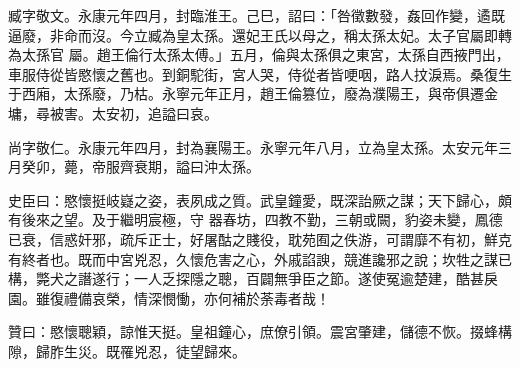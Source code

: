 \begin{pinyinscope}
 臧字敬文。永康元年四月，封臨淮王。己巳，詔曰：「咎徵數發，姦回作變，遹既逼廢，非命而沒。今立臧為皇太孫。還妃王氏以母之，稱太孫太妃。太子官屬即轉為太孫官
 屬。趙王倫行太孫太傅。」五月，倫與太孫俱之東宮，太孫自西掖門出，車服侍從皆愍懷之舊也。到銅駝街，宮人哭，侍從者皆哽咽，路人抆淚焉。桑復生于西廂，太孫廢，乃枯。永寧元年正月，趙王倫篡位，廢為濮陽王，與帝俱遷金墉，尋被害。太安初，追謚曰哀。



 尚字敬仁。永康元年四月，封為襄陽王。永寧元年八月，立為皇太孫。太安元年三月癸卯，薨，帝服齊衰期，謚曰沖太孫。



 史臣曰：愍懷挺岐嶷之姿，表夙成之質。武皇鐘愛，既深詒厥之謀；天下歸心，頗有後來之望。及于繼明宸極，守
 器春坊，四教不勤，三朝或闕，豹姿未變，鳳德已衰，信惑奸邪，疏斥正士，好屠酤之賤役，耽苑囿之佚游，可謂靡不有初，鮮克有終者也。既而中宮兇忍，久懷危害之心，外戚諂諛，競進讒邪之說；坎牲之謀已構，斃犬之譖遂行；一人乏探隱之聰，百闢無爭臣之節。遂使冤逾楚建，酷甚戾園。雖復禮備哀榮，情深憫慟，亦何補於荼毒者哉！



 贊曰：愍懷聰穎，諒惟天挺。皇祖鐘心，庶僚引領。震宮肇建，儲德不恢。掇蜂構隙，歸胙生災。既罹兇忍，徒望歸來。



\end{pinyinscope}